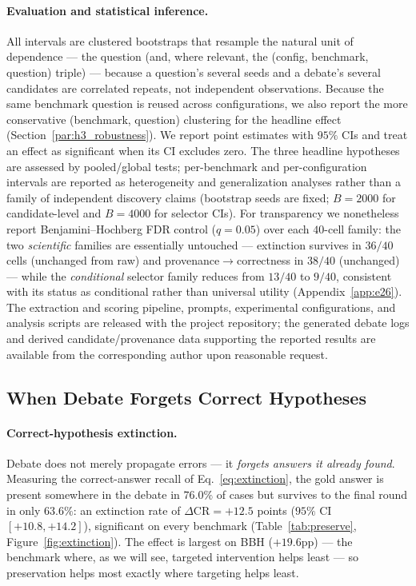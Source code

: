 \paragraph{Evaluation and statistical inference.}
\label{par:statistical_analysis}
All intervals are clustered bootstraps that resample the natural unit of dependence --- the question
(and, where relevant, the (config, benchmark, question) triple) --- because a question's several seeds and a
debate's several candidates are correlated repeats, not independent observations. Because the same benchmark
question is reused across configurations, we also report the more conservative (benchmark, question)
clustering for the headline effect (Section~\ref{par:h3_robustness}). We report point estimates with $95\%$ CIs and
treat an effect as significant when its CI excludes zero. The three headline hypotheses are assessed by
pooled/global tests; per-benchmark and per-configuration intervals are reported as heterogeneity and
generalization analyses rather than a family of independent discovery claims (bootstrap seeds are fixed;
$B=2000$ for candidate-level and $B=4000$ for selector CIs). For transparency we nonetheless report
Benjamini--Hochberg FDR control ($q=0.05$) over each $40$-cell family: the two \emph{scientific} families are
essentially untouched --- extinction survives in $36/40$ cells (unchanged from raw) and
provenance$\to$correctness in $38/40$ (unchanged) --- while the \emph{conditional} selector family reduces
from $13/40$ to $9/40$, consistent with its status as conditional rather than universal utility
(Appendix~\ref{app:e26}).
The extraction and scoring pipeline, prompts, experimental configurations, and analysis scripts are released
with the project repository; the generated debate logs and derived candidate/provenance data supporting the
reported results are available from the corresponding author upon reasonable request.


\subsection{When Debate Forgets Correct Hypotheses}
\label{subsec:extinction_results}

\paragraph{Correct-hypothesis extinction.}
\label{par:extinction_results}
Debate does not merely propagate errors --- it \emph{forgets answers it already found}. Measuring the
correct-answer recall of Eq.~\ref{eq:extinction}, the gold answer is present somewhere in the debate in
$76.0\%$ of cases but survives to the final round in only $63.6\%$: an extinction rate of
$\Delta\mathrm{CR}=+12.5$ points ($95\%$ CI $[+10.8,+14.2]$), significant on every benchmark
(Table~\ref{tab:preserve}, Figure~\ref{fig:extinction}). The effect is largest on BBH ($+19.6$pp) --- the
benchmark where, as we will see, targeted intervention helps least --- so preservation helps most exactly
where targeting helps least.

